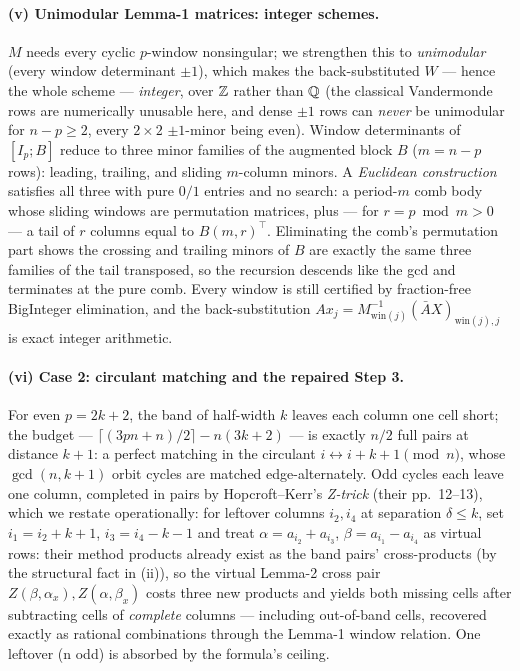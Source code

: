 \paragraph{(v) Unimodular Lemma-1 matrices: integer schemes.}
\(M\) needs every cyclic \(p\)-window nonsingular; we strengthen this to
\emph{unimodular} (every window determinant \(\pm 1\)), which makes the
back-substituted \(W\) — hence the whole scheme — \emph{integer}, over
\(\mathbb{Z}\) rather than \(\mathbb{Q}\) (the classical Vandermonde rows
are numerically unusable here, and dense \(\pm1\) rows can \emph{never} be
unimodular for \(n-p \ge 2\), every \(2\times2\) \(\pm1\)-minor being
even). Window determinants of \([I_p; B]\) reduce to three minor families
of the augmented block \(B\) (\(m = n-p\) rows): leading, trailing, and
sliding \(m\)-column minors. A \emph{Euclidean construction} satisfies all
three with pure \(0/1\) entries and no search: a period-\(m\) comb body
whose sliding windows are permutation matrices, plus — for
\(r = p \bmod m > 0\) — a tail of \(r\) columns equal to
\(B(m, r)^{\!\top}\). Eliminating the comb's permutation part shows the
crossing and trailing minors of \(B\) are exactly the same three families
of the tail transposed, so the recursion descends like the gcd and
terminates at the pure comb. Every window is still certified by
fraction-free BigInteger elimination, and the back-substitution
\(A x_j = M_{\mathrm{win}(j)}^{-1}(\bar A X)_{\mathrm{win}(j),j}\) is exact
integer arithmetic.

\paragraph{(vi) Case 2: circulant matching and the repaired Step 3.} For even
\(p = 2k+2\), the band of half-width \(k\) leaves each column one cell short;
the budget — \(\lceil(3pn{+}n)/2\rceil - n(3k{+}2)\) — is exactly \(n/2\)
full pairs at distance \(k{+}1\): a perfect matching in the circulant
\(i \leftrightarrow i{+}k{+}1 \pmod n\), whose \(\gcd(n,k{+}1)\) orbit
cycles are matched edge-alternately. Odd cycles each leave one column,
completed in pairs by Hopcroft--Kerr's \emph{Z-trick} (their pp.~12--13),
which we restate operationally: for leftover columns \(i_2, i_4\) at
separation \(\delta \le k\), set \(i_1 = i_2{+}k{+}1\), \(i_3 = i_4{-}k{-}1\)
and treat \(\alpha = a_{i_2}{+}a_{i_3}\), \(\beta = a_{i_1}{-}a_{i_4}\) as
virtual rows: their method products already exist as the band pairs'
cross-products (by the structural fact in (ii)), so the virtual Lemma-2 cross
pair \(Z(\beta,\alpha_x), Z(\alpha,\beta_x)\) costs three new products and
yields both missing cells after subtracting cells of \emph{complete} columns
— including out-of-band cells, recovered exactly as rational combinations
through the Lemma-1 window relation. One leftover (n odd) is absorbed by the
formula's ceiling.

